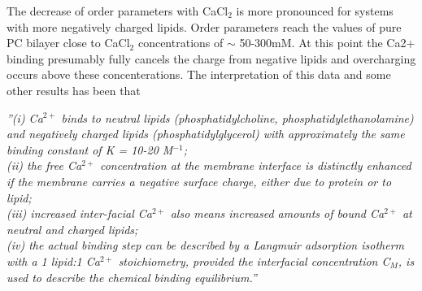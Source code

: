 \documentclass[aps,prl,superscriptaddress,twocolumn]{revtex4}
\begin{document}
The decrease of order parameters with CaCl$_2$
is more pronounced for systems with more
negatively charged lipids.%
Order parameters reach the values of pure PC bilayer close to CaCl$_2$ concentrations of $\sim$ 50-300mM.
At this point the Ca2+ binding presumably fully cancels the charge from negative lipids and
overcharging occurs above these concenterations.
The interpretation of this data and some other results has been that \cite{seelig90}
\begin{displayquote}
  {\it ''(i) Ca$^{2+}$ binds to neutral lipids (phosphatidylcholine, phosphatidylethanolamine) and negatively charged lipids
    (phosphatidylglycerol) with approximately the same binding constant of K = 10-20 M$^{-1}$; \\
    (ii) the free Ca$^{2+}$
    concentration at the membrane interface is distinctly enhanced if the membrane carries a negative surface
    charge, either due to protein or to lipid; \\
    (iii) increased inter-facial Ca$^{2+}$ also means increased amounts
    of bound Ca$^{2+}$ at neutral and charged lipids; \\
    (iv) the actual binding step can be described by a Langmuir
    adsorption isotherm with a 1 lipid:1 Ca$^{2+}$ stoichiometry, provided the interfacial concentration C$_M$, is
    used to describe the chemical binding equilibrium.''}
\end{displayquote}
\end{document}
